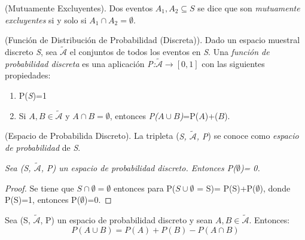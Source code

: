 \begin{defn}(Mutuamente Excluyentes). Dos eventos \textit{$A_{1}, A_{2} \subseteq S$} se dice que son \textit{mutuamente excluyentes} si y solo si \textit{$A_{1}\cap A_{2} =\emptyset$}.
\end{defn}

\begin{defn}(Función de Distribución de Probabilidad (Discreta)). Dado un espacio muestral discreto \textit{S}, sea $\mathcal{\tilde{A}}$ el conjuntos de todos los eventos en \textit{S}. Una \textit{función de probabilidad discreta} es una aplicación \textit{P:$\mathcal{\tilde{A}} \longrightarrow [0, 1]$} con las siguientes propiedades:
	\begin{enumerate}
		\item P(\textit{S})=1
		\item Si \textit{$A, B\in \mathcal{\tilde{A}}$} y $A\cap B=\emptyset$, entonces \textit{P($A\cup B$)}=P($A$)+($B$).
	\end{enumerate}
\end{defn}

\begin{defn}(Espacio de Probabilida Discreto). La tripleta (\textit{S, $\mathcal{\tilde{A}}$, P}) se conoce como \textit{espacio de probabilidad} de \textit{S}.
	
\end{defn}

\begin{lem} \textit{Sea (S, $\mathcal{\tilde{A}}$, P) un espacio de probabilidad discreto. Entonces P($\emptyset$)= 0.}
\end{lem}

\begin{proof}
	Se tiene que $S\cap\emptyset=\emptyset$ entonces para P($S\cup \emptyset$ = S)= P(S)+P($\emptyset$), donde P(S)=1, entonces P($\emptyset$)=0.
\end{proof}


\begin{lem}Sea (S, $\mathcal{\tilde{A}}$, P) un espacio de probabilidad discreto y sean $A, B \in \mathcal{\tilde{A}}$. Entonces: \begin{equation}\label{punion}
		P(A\cup B)=P(A)+P(B)-P(A\cap B)
		\end{equation}
	
\end{lem}

